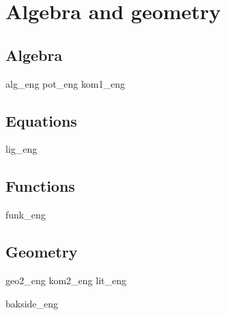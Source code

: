 \part{Algebra and geometry \label{Del2}}
\chapter{Algebra}
\newpage
{alg_eng}
{pot_eng}
\newpage
{kom1_eng}

\chapter{Equations \label{Likningar}}
\newpage
{lig_eng}

\chapter{Functions \label{Funksjoner}}
{funk_eng}

\chapter{Geometry}
\newpage
{geo2_eng}
\newpage
{kom2_eng}
{lit_eng}
{\printindex {}
	}
{bakside_eng}













